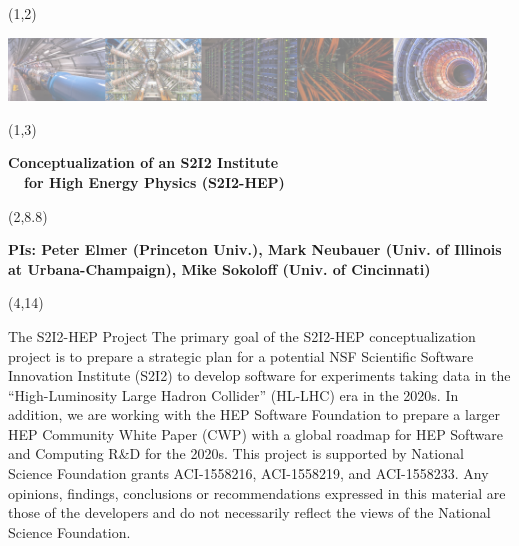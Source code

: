 \documentclass[final]{beamer}
\begin{document}
\begin{frame}{} 




\begin{textblock}{84.0}(1,2)
\begin{center}
\includegraphics[width=0.95\textwidth]{images/s2i2-banner-50percent.png}
\end{center}
\end{textblock}

\begin{textblock}{84.0}(1,3)
\begin{center}
\begin{Huge}
\textbf{
Conceptualization of an S2I2 Institute \\
~~for High Energy Physics (S2I2-HEP)
}
\end{Huge}
\end{center}
\end{textblock}

\begin{textblock}{84.0}(2,8.8)
\begin{center}
\begin{Large}
\textbf{
PIs: Peter Elmer (Princeton Univ.), Mark Neubauer (Univ. of Illinois \\ 
at Urbana-Champaign), Mike Sokoloff (Univ. of Cincinnati)
}
\end{Large}
\end{center}
\end{textblock}

\begin{textblock}{78.0}(4,14)
\begin{block}{The S2I2-HEP Project}
The primary goal of the S2I2-HEP conceptualization project is to
prepare a strategic plan for a potential NSF Scientific Software
Innovation Institute (S2I2) to develop software for experiments
taking data in the ``High-Luminosity Large Hadron Collider'' (HL-LHC)
era in the 2020s. In addition, we are working with the HEP Software
Foundation to prepare a larger HEP Community White Paper (CWP)
with a global roadmap for HEP Software and Computing R\&D for
the 2020s. 
This project is supported by National Science Foundation grants ACI-1558216, ACI-1558219, and ACI-1558233. Any opinions, findings, conclusions or recommendations expressed in this material are those of the developers and do not necessarily reflect the views of the National Science Foundation.


\end{block}
\end{textblock}
\end{frame}
\end{document}

